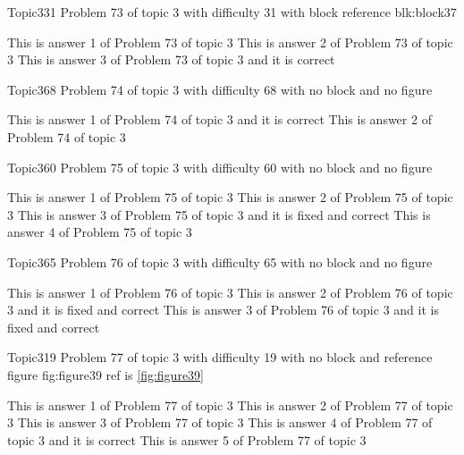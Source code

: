 \documentclass[master]{exam}
\begin{document}
\begin{problem}[requires=blk:block37]{Topic3}{31}
	Problem 73 of topic 3 with difficulty 31 with block reference blk:block37
	\begin{answers}
		\answer This is answer 1 of Problem 73 of topic 3 
		\answer This is answer 2 of Problem 73 of topic 3 
		\answer[correct] This is answer 3 of Problem 73 of topic 3 and it is correct
	\end{answers}
\end{problem}

\begin{problem}{Topic3}{68}
	Problem 74 of topic 3 with difficulty 68 with no block and no figure
	\begin{answers}
		\answer[correct] This is answer 1 of Problem 74 of topic 3 and it is correct
		\answer This is answer 2 of Problem 74 of topic 3 
	\end{answers}
\end{problem}

\begin{problem}{Topic3}{60}
	Problem 75 of topic 3 with difficulty 60 with no block and no figure
	\begin{answers}
		\answer This is answer 1 of Problem 75 of topic 3 
		\answer This is answer 2 of Problem 75 of topic 3 
		 This is answer 3 of Problem 75 of topic 3 and it is fixed and correct
		\answer This is answer 4 of Problem 75 of topic 3 
	\end{answers}
\end{problem}

\begin{problem}{Topic3}{65}
	Problem 76 of topic 3 with difficulty 65 with no block and no figure
	\begin{answers}
		\answer This is answer 1 of Problem 76 of topic 3 
		 This is answer 2 of Problem 76 of topic 3 and it is fixed and correct
		 This is answer 3 of Problem 76 of topic 3 and it is fixed and correct
	\end{answers}
\end{problem}

\begin{problem}{Topic3}{19}
	Problem 77 of topic 3 with difficulty 19 with no block and reference figure fig:figure39 ref is \ref{fig:figure39}
	\begin{answers}
		\answer This is answer 1 of Problem 77 of topic 3 
		\answer This is answer 2 of Problem 77 of topic 3 
		\answer This is answer 3 of Problem 77 of topic 3 
		\answer[correct] This is answer 4 of Problem 77 of topic 3 and it is correct
		\answer This is answer 5 of Problem 77 of topic 3 
	\end{answers}
\end{problem}
\end{document}
